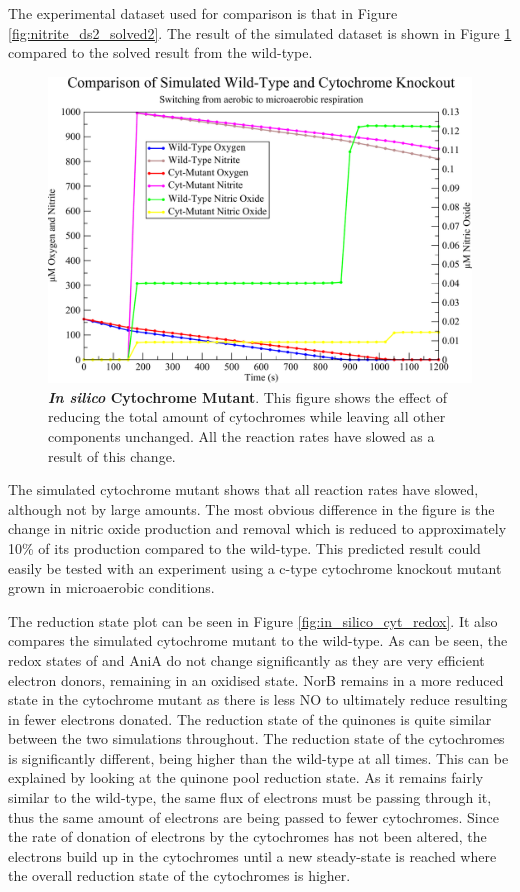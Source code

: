The experimental dataset used for comparison is that in Figure \ref{fig:nitrite_ds2_solved2}. The result of the simulated dataset is shown in Figure \ref{fig:in_silico_cyt} compared to the solved result from the wild-type.
\begin{figure}[tbp]
 \centering
 \includegraphics[width=15cm, clip=true]{./09-completedmodel/data/in_silico_cyt.pdf}
 \caption[In Silico Cytochrome Mutant]{{\bf \textit{In silico} Cytochrome Mutant}. This figure shows the effect of reducing the total amount of cytochromes while leaving all other components unchanged. All the reaction rates have slowed as a result of this change.
 \label{fig:in_silico_cyt}}
\end{figure}

The simulated cytochrome mutant shows that all reaction rates have slowed, although not by large amounts. The most obvious difference in the figure is the change in nitric oxide production and removal which is reduced to approximately 10\% of its production compared to the wild-type. This predicted result could easily be tested with an experiment using a c-type cytochrome knockout mutant grown in microaerobic conditions.

The reduction state plot can be seen in Figure \ref{fig:in_silico_cyt_redox}. It also compares the simulated cytochrome mutant to the wild-type. As can be seen, the redox states of \cbbthree{} and AniA do not change significantly as they are very efficient electron donors, remaining in an oxidised state. NorB remains in a more reduced state in the cytochrome mutant as there is less NO to ultimately reduce resulting in fewer electrons donated. The reduction state of the quinones is quite similar between the two simulations throughout. The reduction state of the cytochromes is significantly different, being higher than the wild-type at all times. This can be explained by looking at the quinone pool reduction state. As it remains fairly similar to the wild-type, the same flux of electrons must be passing through it, thus the same amount of electrons are being passed to fewer cytochromes. Since the rate of donation of electrons by the cytochromes has not been altered, the electrons build up in the cytochromes until a new steady-state is reached where the overall reduction state of the cytochromes is higher.

